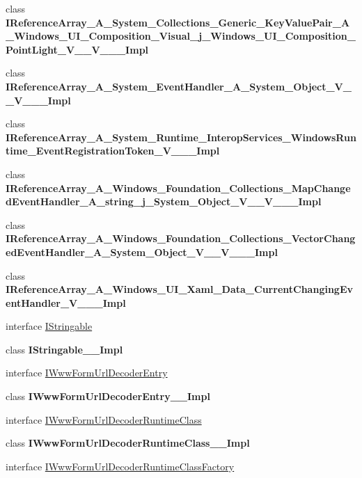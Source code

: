 \begin{DoxyCompactItemize}
\item 
class {\bfseries I\+Reference\+Array\+\_\+\+A\+\_\+\+System\+\_\+\+Collections\+\_\+\+Generic\+\_\+\+Key\+Value\+Pair\+\_\+\+A\+\_\+\+Windows\+\_\+\+U\+I\+\_\+\+Composition\+\_\+\+Visual\+\_\+j\+\_\+\+Windows\+\_\+\+U\+I\+\_\+\+Composition\+\_\+\+Point\+Light\+\_\+\+V\+\_\+\+\_\+\+V\+\_\+\+\_\+\+\_\+\+Impl}
\item 
class {\bfseries I\+Reference\+Array\+\_\+\+A\+\_\+\+System\+\_\+\+Event\+Handler\+\_\+\+A\+\_\+\+System\+\_\+\+Object\+\_\+\+V\+\_\+\+\_\+\+V\+\_\+\+\_\+\+\_\+\+Impl}
\item 
class {\bfseries I\+Reference\+Array\+\_\+\+A\+\_\+\+System\+\_\+\+Runtime\+\_\+\+Interop\+Services\+\_\+\+Windows\+Runtime\+\_\+\+Event\+Registration\+Token\+\_\+\+V\+\_\+\+\_\+\+\_\+\+Impl}
\item 
class {\bfseries I\+Reference\+Array\+\_\+\+A\+\_\+\+Windows\+\_\+\+Foundation\+\_\+\+Collections\+\_\+\+Map\+Changed\+Event\+Handler\+\_\+\+A\+\_\+string\+\_\+j\+\_\+\+System\+\_\+\+Object\+\_\+\+V\+\_\+\+\_\+\+V\+\_\+\+\_\+\+\_\+\+Impl}
\item 
class {\bfseries I\+Reference\+Array\+\_\+\+A\+\_\+\+Windows\+\_\+\+Foundation\+\_\+\+Collections\+\_\+\+Vector\+Changed\+Event\+Handler\+\_\+\+A\+\_\+\+System\+\_\+\+Object\+\_\+\+V\+\_\+\+\_\+\+V\+\_\+\+\_\+\+\_\+\+Impl}
\item 
class {\bfseries I\+Reference\+Array\+\_\+\+A\+\_\+\+Windows\+\_\+\+U\+I\+\_\+\+Xaml\+\_\+\+Data\+\_\+\+Current\+Changing\+Event\+Handler\+\_\+\+V\+\_\+\+\_\+\+\_\+\+Impl}
\item 
interface \hyperlink{interface_windows_1_1_foundation_1_1_i_stringable}{I\+Stringable}
\item 
class {\bfseries I\+Stringable\+\_\+\+\_\+\+Impl}
\item 
interface \hyperlink{interface_windows_1_1_foundation_1_1_i_www_form_url_decoder_entry}{I\+Www\+Form\+Url\+Decoder\+Entry}
\item 
class {\bfseries I\+Www\+Form\+Url\+Decoder\+Entry\+\_\+\+\_\+\+Impl}
\item 
interface \hyperlink{interface_windows_1_1_foundation_1_1_i_www_form_url_decoder_runtime_class}{I\+Www\+Form\+Url\+Decoder\+Runtime\+Class}
\item 
class {\bfseries I\+Www\+Form\+Url\+Decoder\+Runtime\+Class\+\_\+\+\_\+\+Impl}
\item 
interface \hyperlink{interface_windows_1_1_foundation_1_1_i_www_form_url_decoder_runtime_class_factory}{I\+Www\+Form\+Url\+Decoder\+Runtime\+Class\+Factory}

\end{DoxyCompactItemize}
